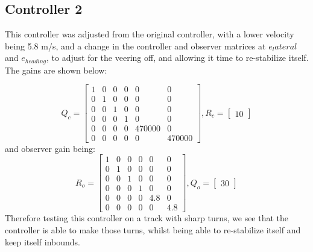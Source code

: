 \documentclass{article}
\begin{document}
\subsection{Controller 2}
This controller was adjusted from the original controller, with a lower velocity being 5.8 m/s, and a change in the controller and observer matrices at $e_lateral$ and $e_{heading}$, to adjust for the veering off, and allowing it time to re-stabilize itself. The gains are shown below:

\begin{equation*}
    Q_{c} = \begin{bmatrix}
    1 & 0 & 0 & 0 & 0& 0\\
    0 & 1 & 0 & 0 & 0 & 0\\
    0 & 0 & 1 & 0 & 0 & 0\\
    0 & 0 & 0 & 1 & 0& 0\\
    0 & 0 & 0 & 0 & 470000& 0\\0&0&0&0&0&470000
    \end{bmatrix} , R_{c} = \begin{bmatrix}
    10
    \end{bmatrix}
\end{equation*}
and observer gain being:
 \begin{equation*}
     R_{o}= \begin{bmatrix}
     1 & 0 & 0 & 0 & 0& 0\\
    0 & 1 & 0 & 0 & 0 & 0\\
    0 & 0 & 1 & 0 & 0 & 0\\
    0 & 0 & 0 & 1 & 0& 0\\
    0 & 0 & 0 & 0 & 4.8& 0\\0&0&0&0&0&4.8
    \end{bmatrix} , Q_{o} = \begin{bmatrix}
    30
    \end{bmatrix}
 \end{equation*}
 Therefore testing this controller on a track with sharp turns, we see that the controller is able to make those turns, whilst being able to re-stabilize itself and keep itself inbounds. 
\end{document}
